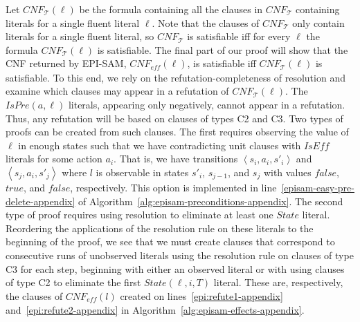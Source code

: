 \documentclass{article}
\theoremstyle{plain}
\theoremstyle{definition}
\theoremstyle{remark}
\theoremstyle{observation}
\newcommand{\tuple}[1]{\ensuremath{\left \langle #1 \right \rangle }}
\newcommand{\eff}{\textit{eff}}
\newcommand{\cnf}{\textit{CNF}}
\newcommand{\true}{\textit{true}}
\newcommand{\false}{\textit{false}}
\newcommand{\iseff}{\textit{IsEff}}
\newcommand{\ispre}{\textit{IsPre}}
\newcommand{\state}{\textit{State}}
\begin{document}
Let $\cnf_\mathcal{T}(\ell)$ be the formula containing all the clauses in $\cnf_\mathcal{T}$ containing literals for a single fluent literal $\ell$.
Note that the clauses of $\cnf_\mathcal{T}$ only contain literals for a single fluent literal, so 
$\cnf_\mathcal{T}$ is satisfiable iff for every $\ell$ the formula $\cnf_{\mathcal{T}}(\ell)$ is satisfiable. 
The final part of our proof will show that the CNF returned by EPI-SAM, $\cnf_\eff(\ell)$, is satisfiable iff $\cnf_\mathcal{T}(\ell)$ is satisfiable. 
To this end, we rely on the refutation-completeness of resolution and examine which clauses may appear in a refutation of $\cnf_{\mathcal{T}}(\ell)$. 
The $\ispre(a,\ell)$ literals, appearing only negatively, cannot appear in a refutation. 
Thus, any refutation will be based on clauses of types C2 and C3. 
Two types of proofs can be created from such clauses. 
The first requires observing the value of $\ell$ in enough states such that we have contradicting unit clauses with $\iseff$ literals for some action $a_i$. That is, we have transitions 
$\tuple{s_i,a_i,s'_i}$ and $\tuple{s_j,a_i,s'_j}$
where $l$ is observable in states 
$s'_i$, $s_{j-1}$, and $s_j$ 
with values $\false$, $\true$, and $\false$, respectively.
This option is implemented in line~\ref{episam-easy-pre-delete-appendix} of Algorithm~\ref{alg:episam-preconditions-appendix}. 
The second type of proof requires using resolution to eliminate at least one $\state$ literal. Reordering the applications of the resolution rule on these literals to the beginning of the proof, we see that we must create clauses that correspond to consecutive runs of unobserved literals using the resolution rule on clauses of type C3 for each step, beginning with either an observed literal or with using clauses of type C2 to eliminate the first $\state(\ell, i, T)$ literal. These are, respectively, the clauses of $\cnf_{\eff}(l)$ created on lines~\ref{epi:refute1-appendix} and~\ref{epi:refute2-appendix} in Algorithm~\ref{alg:episam-effects-appendix}.
\end{document}
